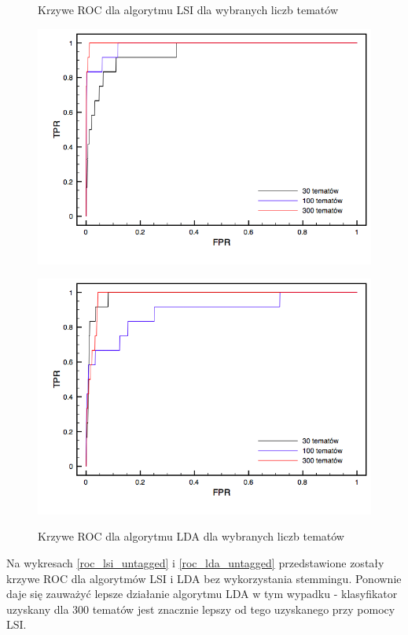 \documentclass[11pt,a4paper]{article}
\begin{document}
\begin{figure}[h]
\caption{Krzywe ROC dla algorytmu LSI dla wybranych liczb tematów}
\includegraphics[width=\linewidth]{gfx/lsi_roc.png}
\label{roc_lsi}

\caption{Krzywe ROC dla algorytmu LDA dla wybranych liczb tematów}
\includegraphics[width=\linewidth]{gfx/lda_roc.png}
\label{roc_lda}
\end{figure}

Na wykresach \ref{roc_lsi_untagged} i \ref{roc_lda_untagged} przedstawione
zostały krzywe ROC dla algorytmów LSI i LDA bez wykorzystania stemmingu.
Ponownie daje się zauważyć lepsze działanie algorytmu LDA w tym wypadku -
klasyfikator uzyskany dla 300 tematów jest znacznie lepszy od tego uzyskanego
przy pomocy LSI.
\end{document}
